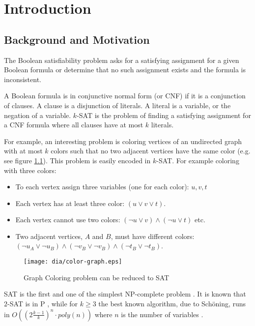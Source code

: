 \chapter{Introduction}

\section{Background and Motivation}

The Boolean satisfiability problem asks for a satisfying
assignment for a given Boolean formula or determine
that no such assignment exists and the formula is inconsistent.

A Boolean formula is in conjunctive normal form (or
CNF) if it is a conjunction of clauses. A clause is a disjunction
of literals. A literal is a variable, or the negation of a
variable. $k$-SAT is the problem of finding a satisfying assignment
for a CNF formula where all clauses have at most $k$ literals.

For example, an interesting problem is coloring vertices
of an undirected graph with at most $k$ colors such that no
two adjacent vertices have the same color (e.g. see figure
\ref{fig:color-graph}). This problem is easily encoded
in $k$-SAT. For example coloring with three colors:
\begin{itemize}
  \item To each vertex assign three variables (one for each color): $u, v, t$
  \item Each vertex has at least three color: $(u \lor v \lor t)$.
  \item Each vertex cannot use two colors:
  $(\neg u \lor v) \land (\neg u \lor t)$ etc.
  \item Two adjacent vertices, $A$ and $B$, must have different colors:
  $(\neg u_A \lor \neg u_B) \land (\neg v_B \lor \neg v_B) \land (\neg t_B \lor \neg t_B)$.
\end{itemize}

\begin{figure}
  \centering
  \texttt{[image: dia/color-graph.eps]}
  \caption{Graph Coloring problem can be reduced to SAT}
  \label{fig:color-graph}
\end{figure}

SAT is the first and one of the simplest NP-complete problem
\cite{Cook:1971:CTP:800157.805047}. It is known that
$2$-SAT is in P \cite{karp}, while for $k \ge 3$ the best
known algorithm, due to Sch\"{o}ning, runs in $O((2\frac{k -
1}{k})^n \cdot poly(n))$ where $n$ is the number of variables
\cite{Schoning:1999:PAK:795665.796524}.
 
